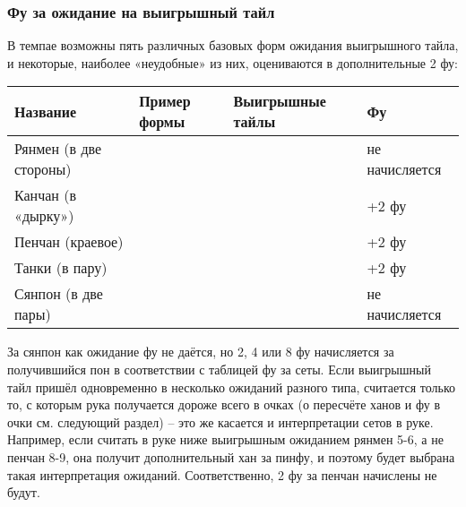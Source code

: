 \subsubsection{Фу за ожидание на выигрышный тайл}

В темпае возможны пять различных базовых форм ожидания выигрышного тайла, и некоторые, наиболее «неудобные» из них, оцениваются в дополнительные 2 фу:

\noindent\begin{tabular}{|C{3cm}|C{5cm}|C{3cm}|C{3cm}|}
\hline
	Название  &
	Пример формы &
	Выигрышные тайлы &
	Фу \\
\hline
	\rule[0ex]{0pt}{5ex} Рянмен \newline (в две стороны) \newline &
	 &
	 &
	не начисляется \\
\hline
	\rule[0ex]{0pt}{5ex} Канчан \newline (в «дырку») \newline &
	 &
	 &
	+2 фу \\
\hline
	\rule[0ex]{0pt}{5ex} Пенчан \newline (краевое) \newline &
	 &
	 &
	+2 фу \\
\hline
	\rule[0ex]{0pt}{5ex} Танки \newline (в пару) \newline &
	 &
	 &
	+2 фу \\
\hline
	\rule[0ex]{0pt}{5ex} Сянпон \newline (в две пары) \newline &
	 &
	 &
	не начисляется \\
\hline
\end{tabular}

За сянпон как ожидание фу не даётся, но 2, 4 или 8 фу начисляется за получившийся пон в соответствии с таблицей фу за сеты. Если выигрышный тайл пришёл одновременно в несколько ожиданий разного типа, считается только то, с которым рука получается дороже всего в очках (о пересчёте ханов и фу в очки см. следующий раздел) – это же касается и интерпретации сетов в руке. Например, если считать в руке ниже выигрышным ожиданием рянмен 5-6, а не пенчан 8-9, она получит дополнительный хан за  пинфу,  и поэтому будет выбрана такая интерпретация ожиданий. Соответственно, 2 фу за пенчан начислены не будут.


